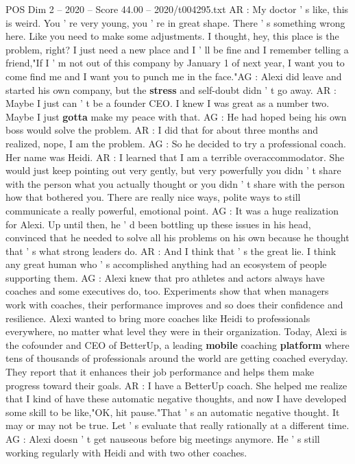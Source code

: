 \begin{textsample}{POS Dim 2 – 2020 – Score 44.00 – 2020/t004295.txt}
AR : My doctor ' s like, this is weird.
You ' re very young, you ' re in great shape.
There ' s something wrong here.
Like you need to make some adjustments.
I thought, hey, this place is the problem, right?
I just need a new place and I ' ll be fine and I remember telling a friend,"If I ' m not out of this company by January 1 of next year, I want you to come find me and I want you to punch me in the face."AG : Alexi did leave and started his own company, but the \textbf{stress} and self-doubt didn ' t go away.
AR : Maybe I just can ' t be a founder CEO.
I knew I was great as a number two.
Maybe I just \textbf{gotta} make my peace with that.
AG : He had hoped being his own boss would solve the problem.
AR : I did that for about three months and realized, nope, I am the problem.
AG : So he decided to try a professional coach.
Her name was Heidi.
AR : I learned that I am a terrible overaccommodator.
She would just keep pointing out very gently, but very powerfully you didn ' t share with the person what you actually thought or you didn ' t share with the person how that bothered you.
There are really nice ways, polite ways to still communicate a really powerful, emotional point.
AG : It was a huge realization for Alexi.
Up until then, he ' d been bottling up these issues in his head, convinced that he needed to solve all his problems on his own because he thought that ' s what strong leaders do.
AR : And I think that ' s the great lie.
I think any great human who ' s accomplished anything had an ecosystem of people supporting them.
AG : Alexi knew that pro athletes and actors always have coaches and some executives do, too.
Experiments show that when managers work with coaches, their performance improves and so does their confidence and resilience.
Alexi wanted to bring more coaches like Heidi to professionals everywhere, no matter what level they were in their organization.
Today, Alexi is the cofounder and CEO of BetterUp, a leading \textbf{mobile} coaching \textbf{platform} where tens of thousands of professionals around the world are getting coached everyday.
They report that it enhances their job performance and helps them make progress toward their goals.
AR : I have a BetterUp coach.
She helped me realize that I kind of have these automatic negative thoughts, and now I have developed some skill to be like,"OK, hit pause."That ' s an automatic negative thought.
It may or may not be true.
Let ' s evaluate that really rationally at a different time.
AG : Alexi doesn ' t get nauseous before big meetings anymore.
He ' s still working regularly with Heidi and with two other coaches.

\end{textsample}
